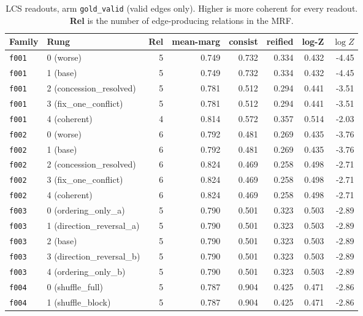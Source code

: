 \documentclass[11pt]{article}
\begin{document}
\begin{table}[htbp]
\centering
\small
\caption{LCS readouts, arm \texttt{gold\_valid} (valid edges only). Higher is more coherent for every readout. \textbf{Rel} is the number of edge-producing relations in the MRF.}
\label{tab:scores-gold-valid}
\begin{tabular}{llrrrrrr}
\toprule
Family & Rung & Rel & \textbf{mean-marg} & \textbf{consist} & \textbf{reified} & \textbf{log-Z} & $\log Z$ \\
\midrule
\texttt{f001} & 0 (worse) & 5 & 0.749 & 0.732 & 0.334 & 0.432 & -4.45 \\
\texttt{f001} & 1 (base) & 5 & 0.749 & 0.732 & 0.334 & 0.432 & -4.45 \\
\texttt{f001} & 2 (concession\_resolved) & 5 & 0.781 & 0.512 & 0.294 & 0.441 & -3.51 \\
\texttt{f001} & 3 (fix\_one\_conflict) & 5 & 0.781 & 0.512 & 0.294 & 0.441 & -3.51 \\
\texttt{f001} & 4 (coherent) & 4 & 0.814 & 0.572 & 0.357 & 0.514 & -2.03 \\
\midrule
\texttt{f002} & 0 (worse) & 6 & 0.792 & 0.481 & 0.269 & 0.435 & -3.76 \\
\texttt{f002} & 1 (base) & 6 & 0.792 & 0.481 & 0.269 & 0.435 & -3.76 \\
\texttt{f002} & 2 (concession\_resolved) & 6 & 0.824 & 0.469 & 0.258 & 0.498 & -2.71 \\
\texttt{f002} & 3 (fix\_one\_conflict) & 6 & 0.824 & 0.469 & 0.258 & 0.498 & -2.71 \\
\texttt{f002} & 4 (coherent) & 6 & 0.824 & 0.469 & 0.258 & 0.498 & -2.71 \\
\midrule
\texttt{f003} & 0 (ordering\_only\_a) & 5 & 0.790 & 0.501 & 0.323 & 0.503 & -2.89 \\
\texttt{f003} & 1 (direction\_reversal\_a) & 5 & 0.790 & 0.501 & 0.323 & 0.503 & -2.89 \\
\texttt{f003} & 2 (base) & 5 & 0.790 & 0.501 & 0.323 & 0.503 & -2.89 \\
\texttt{f003} & 3 (direction\_reversal\_b) & 5 & 0.790 & 0.501 & 0.323 & 0.503 & -2.89 \\
\texttt{f003} & 4 (ordering\_only\_b) & 5 & 0.790 & 0.501 & 0.323 & 0.503 & -2.89 \\
\midrule
\texttt{f004} & 0 (shuffle\_full) & 5 & 0.787 & 0.904 & 0.425 & 0.471 & -2.86 \\
\texttt{f004} & 1 (shuffle\_block) & 5 & 0.787 & 0.904 & 0.425 & 0.471 & -2.86 \\

\end{tabular}
\end{table}
\end{document}
